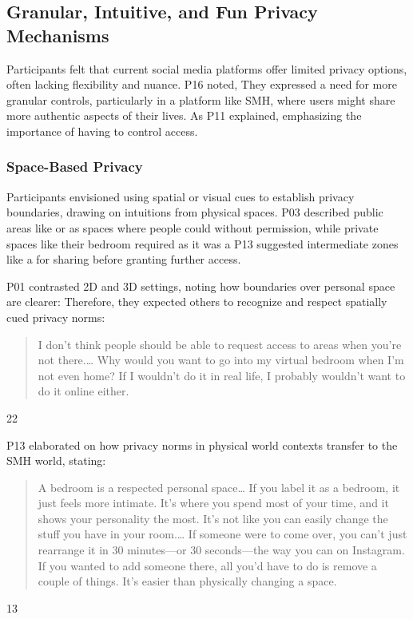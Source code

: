 \subsection{Granular, Intuitive, and Fun Privacy Mechanisms}
\label{lab:4-4}
Participants felt that current social media platforms offer limited privacy options, often lacking flexibility and nuance. P16 noted,  They expressed a need for more granular controls, particularly in a platform like SMH, where users might share more authentic aspects of their lives. As P11 explained,  emphasizing the importance of having  to control access.

\subsubsection{Space-Based Privacy}
\label{lab:4-4-1}
Participants envisioned using spatial or visual cues to establish privacy boundaries, drawing on intuitions from physical spaces. P03 described public areas like   or  as spaces where people could  without permission, while private spaces like their bedroom required  as it was a  P13 suggested intermediate zones like a  for sharing  before granting further access.

P01 contrasted 2D and 3D settings, noting how boundaries over personal space are clearer:  Therefore, they expected others to recognize and respect spatially cued privacy norms: \blockquote{I don't think people should be able to request access to areas when you're not there.\ldots{} Why would you want to go into my virtual bedroom when I'm not even home? If I wouldn't do it in real life, I probably wouldn't want to do it online either.}{22} 

P13 elaborated on how privacy norms in physical world contexts transfer to the SMH world, stating: \blockquote{A bedroom is a respected personal space\ldots{} If you label it as a bedroom, it just feels more intimate. It's where you spend most of your time, and it shows your personality the most. It's not like you can easily change the stuff you have in your room.\ldots{} If someone were to come over, you can't just rearrange it in 30 minutes---or 30 seconds---the way you can on Instagram. If you wanted to add someone there, all you'd have to do is remove a couple of things. It's easier than physically changing a space.}{13}

